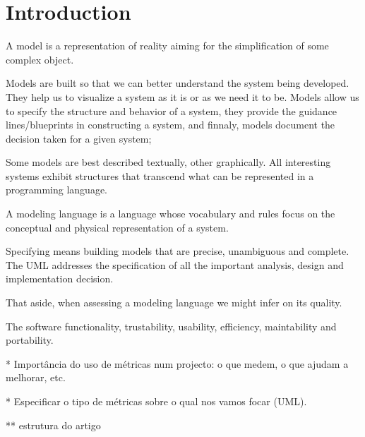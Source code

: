 \section{Introduction}

\indent
\par A model is a representation of reality aiming for the simplification of some complex object.

\par Models are built so that we can better understand the system being developed.
They help us to visualize a system as it is or as we need it to be. Models allow us to specify the structure and behavior of a system, they provide the guidance lines/blueprints in constructing a system, and finnaly, models document the decision taken for a given system;


\par Some models are best described textually, other graphically. All interesting systems exhibit structures that transcend what can be represented in a programming language.


\par A modeling language is a language whose vocabulary and rules focus on the conceptual and physical representation of a system.%

\par Specifying means building models that are precise, unambiguous and complete. The UML addresses the specification of all the important analysis, design and implementation decision. %


\par That aside, when assessing a modeling language we might infer on its quality.
\par The software functionality, trustability, usability, efficiency, maintability and portability.



    * Importância do uso de métricas num projecto: o que medem, o que ajudam a melhorar, etc.

    * Especificar o tipo de métricas sobre o qual nos vamos focar (UML).

    ** estrutura do artigo